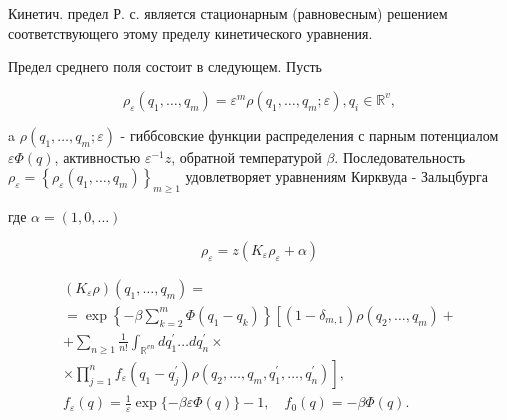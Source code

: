 \documentclass[10pt]{article}
\begin{document}
Кинетич. предел Р. с. является стационарным (равновесным) решением соответствующего этому пределу кинетического уравнения.



Предел среднего поля состоит в следующем. Пусть



\[

\rho_{\varepsilon}\left(q_{1}, \ldots, q_{m}\right)=\varepsilon^{m} \rho\left(q_{1}, \ldots, q_{m} ; \varepsilon\right), q_{i} \in \mathbb{R}^{v},

\]



a $\rho\left(q_{1}, \ldots, q_{m} ; \varepsilon\right)$ - гиббсовские функции распределения с парным потенциалом $\varepsilon \Phi(q)$, активностью $\varepsilon^{-1} z$, обратной температурой $\beta$. Последовательность $\rho_{\varepsilon}=\left\{\rho_{\varepsilon}\left(q_{1}, \ldots, q_{m}\right)\right\}_{m \geqslant 1}$ удовлетворяет уравнениям Кирквуда - Зальцбурга



где $\alpha=(1,0, \ldots)$



\[

\rho_{\varepsilon}=z\left(K_{\varepsilon} \rho_{\varepsilon}+\alpha\right)

\]



\[

\begin{gathered}

\left(K_{\varepsilon} \rho\right)\left(q_{1}, \ldots, q_{m}\right)= \\

=\exp \left\{-\beta \sum_{k=2}^{m} \Phi\left(q_{1}-q_{k}\right)\right\}\left[\left(1-\delta_{m, 1}\right) \rho\left(q_{2}, \ldots, q_{m}\right)+\right. \\

+\sum_{n \geqslant 1} \frac{1}{n !} \int_{\mathbb{R}^{v n}} d q_{1}^{\prime} \ldots d q_{n}^{\prime} \times \\

\left.\times \prod_{j=1}^{n} f_{\varepsilon}\left(q_{1}-q_{j}^{\prime}\right) \rho\left(q_{2}, \ldots, q_{m}, q_{1}^{\prime}, \ldots, q_{n}^{\prime}\right)\right], \\

f_{\varepsilon}(q)=\frac{1}{\varepsilon} \exp \{-\beta \varepsilon \Phi(q)\}-1, \quad f_{0}(q)=-\beta \Phi(q) .

\end{gathered}

\]
\end{document}
